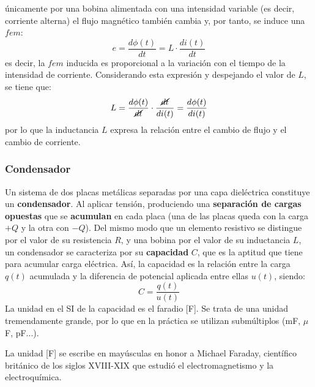 \begin{remark}
          únicamente por una bobina alimentada con una intensidad
          variable (es decir, corriente alterna) el flujo magnético
          también cambia y, por tanto, se induce una $fem$:
          \begin{equation*}
            e=\dfrac{d\phi(t)}{dt}=L\cdot \dfrac{di(t)}{dt} 
          \end{equation*}
          es decir, la $fem$ inducida es proporcional a la variación
          con el tiempo de la intensidad de corriente. Considerando
          esta expresión y despejando el valor de $L$, se tiene que:
          \begin{equation*}
            L= \dfrac{d\phi(t)}{\cancel{dt}}\cdot\dfrac{\cancel{dt}}{di(t)}=\dfrac{d\phi(t)}{di(t)}
          \end{equation*}
          por lo que la inductancia $L$ expresa la relación entre el
          cambio de flujo y el cambio de corriente.
	\end{remark}
	
	
	\subsubsection{Condensador}\label{sec:condensador}
	
	Un sistema de dos placas metálicas separadas por una capa
        dieléctrica constituye un \textbf{condensador}. Al aplicar
        tensión, produciendo una \textbf{separación de cargas
          opuestas} que se \textbf{acumulan} en cada placa (una de las
        placas queda con la carga $+Q$ y la otra con $-Q$). Del mismo
        modo que un elemento resistivo se distingue por el valor de su
        resistencia $R$, y una bobina por el valor de su inductancia
        $L$, un condensador se caracteriza por su \textbf{capacidad}
        $C$, que es la aptitud que tiene para acumular carga
        eléctrica. Así, la capacidad es la relación entre la carga
        $q(t)$ acumulada y la diferencia de potencial aplicada entre
        ellas $u(t)$, siendo:
	\begin{equation}\label{eq:cqu}
          \boxed{C=\dfrac{q(t)}{u(t)}}
	\end{equation}
	La unidad en el SI de la capacidad es el faradio [F]. Se trata
        de una unidad tremendamente grande, por lo que en la práctica
        se utilizan submúltiplos (mF, $\mu$F, pF...).
	\begin{remark}
          La unidad [F] se escribe en mayúsculas en honor a Michael
          Faraday, científico británico de los siglos XVIII-XIX que
          estudió el electromagnetismo y la electroquímica.
	\end{remark}
	

